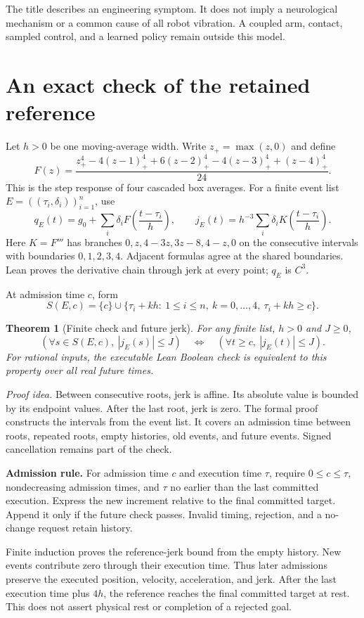 \documentclass[11pt,letterpaper]{article}
\newtheorem{theorem}{Theorem}
\begin{document}
The title describes an engineering symptom. It does not imply a neurological mechanism or a common cause of all robot vibration. A coupled arm, contact, sampled control, and a learned policy remain outside this model.

\newpage
\section{An exact check of the retained reference}
Let $h>0$ be one moving-average width. Write $z_+=\max(z,0)$ and define
\[
F(z)=\frac{z_+^4-4(z-1)_+^4+6(z-2)_+^4-4(z-3)_+^4+(z-4)_+^4}{24}.
\]
This is the step response of four cascaded box averages. For a finite event list $E=((\tau_i,\delta_i))_{i=1}^n$, use
\[
q_E(t)=g_0+\sum_i\delta_i F\left(\frac{t-\tau_i}{h}\right),\qquad
j_E(t)=h^{-3}\sum_i\delta_i K\left(\frac{t-\tau_i}{h}\right).
\]
Here $K=F'''$ has branches $0,z,4-3z,3z-8,4-z,0$ on the consecutive intervals with boundaries $0,1,2,3,4$. Adjacent formulas agree at the shared boundaries. Lean proves the derivative chain through jerk at every point; $q_E$ is $C^3$.

At admission time $c$, form
\[
S(E,c)=\{c\}\cup\{\tau_i+kh:\ 1\leq i\leq n,\ k=0,\ldots,4,\ \tau_i+kh\geq c\}.
\]
\begin{theorem}[Finite check and future jerk]\label{guard}
For any finite list, $h>0$ and $J\geq0$,
\[
(\forall s\in S(E,c),\ |j_E(s)|\leq J)
\quad\Longleftrightarrow\quad
(\forall t\geq c,\ |j_E(t)|\leq J).
\]
For rational inputs, the executable Lean Boolean check is equivalent to this property over all real future times.
\end{theorem}
\textit{Proof idea.} Between consecutive roots, jerk is affine. Its absolute value is bounded by its endpoint values. After the last root, jerk is zero. The formal proof constructs the intervals from the event list. It covers an admission time between roots, repeated roots, empty histories, old events, and future events. Signed cancellation remains part of the check.

\textbf{Admission rule.} For admission time $c$ and execution time $\tau$, require $0\leq c\leq\tau$, nondecreasing admission times, and $\tau$ no earlier than the last committed execution. Express the new increment relative to the final committed target. Append it only if the future check passes. Invalid timing, rejection, and a no-change request retain history.

Finite induction proves the reference-jerk bound from the empty history. New events contribute zero through their execution time. Thus later admissions preserve the executed position, velocity, acceleration, and jerk. After the last execution time plus $4h$, the reference reaches the final committed target at rest. This does not assert physical rest or completion of a rejected goal.
\end{document}
